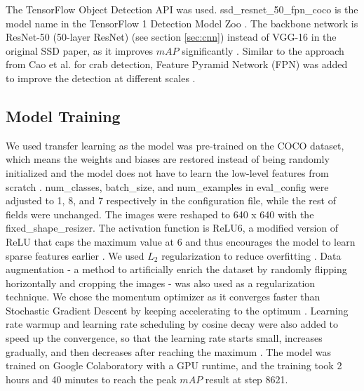 \documentclass[a4paper, 11pt, oneside]{article}
\begin{document}
The TensorFlow Object Detection API \cite{huang2017speed, tfobjectdetection} was used. ssd\_resnet\_50\_fpn\_coco
is the model name in the TensorFlow 1 Detection Model Zoo \cite{tf1detectionmodelzoo}. The backbone network
is ResNet-50 (50-layer ResNet) (see section \ref{sec:cnn}) instead of VGG-16 in the original SSD paper, as it
improves $mAP$ significantly \cite{he2016deep}. Similar to the approach from Cao et al. \cite{cao2020real} for crab
detection, Feature Pyramid Network (FPN) was added to improve the detection at different scales \cite{lin2017feature}.

\subsection{Model Training}

We used transfer learning \cite{torrey2010transfer} as the model was pre-trained on the COCO dataset, which means the
weights and biases are restored instead of being randomly initialized and the model does not have to learn the low-level
features from scratch \cite{geron2019hands}. num\_classes, batch\_size, and num\_examples in eval\_config were adjusted
to 1, 8, and 7 respectively in the configuration file, while the rest of fields were unchanged. The images were reshaped
to 640 x 640 with the fixed\_shape\_resizer. The activation function is ReLU6, a modified version of ReLU that caps
the maximum value at 6 and thus encourages the model to learn sparse features earlier
\cite{krizhevsky2010convolutional}. We used $L_2$ regularization \cite{ng2004feature} to reduce overfitting
\cite{hawkins2004problem}. Data augmentation \cite{krizhevsky2012imagenet} - a method to artificially enrich the
dataset by randomly flipping horizontally and cropping the images - was also used as a regularization technique.
We chose the momentum optimizer \cite{polyak1964some} as it converges faster than Stochastic Gradient Descent
\cite{bottou2010large} by keeping accelerating to the optimum \cite{geron2019hands}. Learning rate warmup and learning
rate scheduling by cosine decay were also added to speed up the convergence, so that the learning rate starts small,
increases gradually, and then decreases after reaching the maximum
\cite{geron2019hands, goyal2017accurate, senior2013empirical, loshchilov2016sgdr}.
The model was trained on Google Colaboratory \cite{colab} with a GPU runtime, and the training took 2 hours and 40
minutes to reach the peak $mAP$ result at step 8621.
\end{document}
